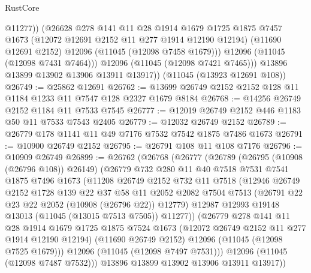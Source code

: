 \begin{lexlean}{RustCore}
\begin{coremodule}
                @11277))
            (@26628
              @278
              @141
              @11
              @28
              @1914
              @1679
              @1725
              @1875
              @7457
              @1673
              (@12072 @12691 @2152 @11 @277 @1914 @12190 @12194)
              (@11690 @12691 @2152)
              @12096
              (@11045 (@12098 @7458 @1679)))
            @12096
            (@11045 (@12098 @7431 @7464)))
          @12096
          (@11045 (@12098 @7421 @7465)))
        @13896
        @13899
        @13902
        @13906
        @13911
        @13917))
    (@11045 (@13923 @12691 @108))
@26749 := @25862 @12691
@26762 := @13699 @26749 @2152 @2152 @128 @11 @1184 @1233 @11 @7547 @128 @2327 @1679 @8184
@26768 := @14256 @26749 @2152 @1184 @11 @7533 @7545
@26777 := @12019 @26749 @2152 @446 @1183 @50 @11 @7533 @7543 @2405
@26779 := @12032 @26749 @2152
@26789 := @26779 @178 @1141 @11 @49 @7176 @7532 @7542 @1875 @7486 @1673
@26791 := @10900 @26749 @2152
@26795 := @26791 @108 @11 @108 @7176
@26796 := @10909 @26749
@26899 := @26762
    (@26768
      (@26777
        (@26789
          (@26795 (@10908 (@26796 @108)) @26149)
          (@26779
            @732
            @280
            @11
            @40
            @7518
            @7531
            @7541
            @1875
            @7496
            @1673
            (@11208
              @26749
              @2152
              @732
              @11
              @7518
              (@12946
                @26749
                @2152
                @1728
                @139
                @22
                @37
                @58
                @11
                @2052
                @2082
                @7504
                @7513
                (@26791 @22 @23 @22 @2052 (@10908 (@26796 @22)) @12779)
                @12987
                @12993
                @19148
                @13013
                (@11045 (@13015 @7513 @7505))
                @11277))
            (@26779
              @278
              @141
              @11
              @28
              @1914
              @1679
              @1725
              @1875
              @7524
              @1673
              (@12072 @26749 @2152 @11 @277 @1914 @12190 @12194)
              (@11690 @26749 @2152)
              @12096
              (@11045 (@12098 @7525 @1679)))
            @12096
            (@11045 (@12098 @7497 @7531)))
          @12096
          (@11045 (@12098 @7487 @7532)))
        @13896
        @13899
        @13902
        @13906
        @13911
        @13917))

\end{coremodule}
\end{lexlean}
